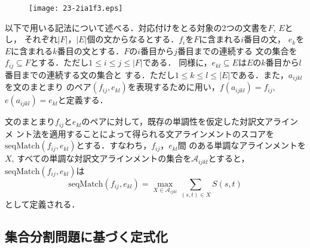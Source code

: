 \documentclass[japanese]{jnlp_1.4}
\begin{document}
\begin{figure}[t]
\begin{center}
\texttt{[image: 23-2ia1f3.eps]}
\end{center}
\label{fig:align_example}
\end{figure}

以下で用いる記法について述べる．対応付けをとる対象の2つの文書を$F$, $E$とし，
それぞれ$|F|$，$|E|$個の文からなるとする．$f_i$を$F$に含まれる$i$番目の文，
$e_k$を$E$に含まれる$k$番目の文とする．$F$の$i$番目から$j$番目までの連続する
文の集合を$f_{ij} \subseteq F$とする．ただし$1 \leq i \leq j \leq |F|$である．
同様に，$e_{kl} \subseteq E$は$E$の$k$番目から$l$番目までの連続する文の集合と
する．ただし$1 \leq k \leq l \leq |E|$である．また，$a_{ijkl}$を文のまとまり
のペア$(f_{ij}, e_{kl})$を表現するために用い，$f(a_{ijkl}) = f_{ij}$,
$e(a_{ijkl}) = e_{kl}$と定義する．

文のまとまり$f_{ij}$と$e_{kl}$のペアに対して，既存の単調性を仮定した対訳文アラインメ
ント法を適用することによって得られる文アラインメントのスコアを
$\mathrm{seqMatch}(f_{ij}, e_{kl})$とする．すなわち，$f_{ij}$，$e_{kl}$間
のある単調なアラインメントを$X$, すべての単調な対訳文アラインメントの集合を$\mathcal{A}_{ijkl}$とすると，
$\mathrm{seqMatch}(f_{ij}, e_{kl})$は
\begin{equation}
\mathrm{seqMatch}(f_{ij}, e_{kl}) = \max_{X \in \mathcal{A}_{ijkl}}
 \sum_{(s, t) \in X} S(s, t)
\end{equation}
として定義される．



\subsection{集合分割問題に基づく定式化}
\end{document}
